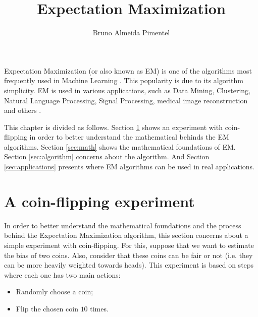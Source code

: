 \title{Expectation Maximization}
\label{chp:label}
\author{Bruno Almeida Pimentel}

\maketitle



Expectation Maximization (or also known as EM) is one of the algorithms most frequently used in Machine Learning \cite{moon1996expectation, do2008expectation}. This popularity is due to its algorithm simplicity. EM is used in various applications, such as Data Mining, Clustering, Natural Language Processing, Signal Processing,  medical image reconstruction and others \cite{dellaert2002expectation, dempster1977maximum, ceppellini1955estimation, tzoreff2017expectation, li2019expectation}.

This chapter is divided as follows. Section \ref{sec:coin} shows an experiment with coin-flipping in order to better understand the mathematical behinds the EM algorithms. Section \ref{sec:math} shows the mathematical foundations of EM. Section \ref{sec:algorithm} concerns about the algorithm. And Section \ref{sec:applications} presents where EM algorithms can be used in real applications. 

\section{A coin-flipping experiment}
\label{sec:coin}

In order to better understand the mathematical foundations and the process behind the Expectation Maximization algorithm, this section concerns about a simple experiment with coin-flipping. For this, suppose that we want to estimate the bias of two coins. Also, consider that these coins can be fair or not (i.e. they can be more heavily weighted towards heads). This experiment is based on steps where each one has two main actions:

\begin{itemize}
    \item Randomly choose a coin;
    \item Flip the chosen coin $10$ times.
\end{itemize}

